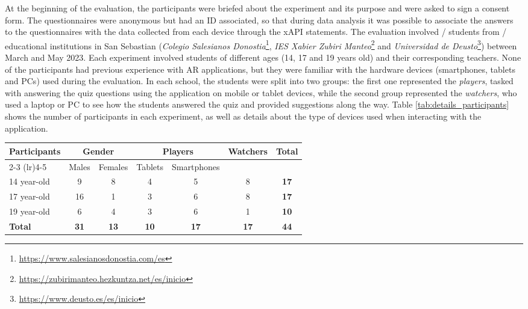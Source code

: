 At the beginning of the evaluation, the participants were briefed about the experiment and its purpose and were asked to sign a consent form.
The questionnaires were anonymous but had an ID associated, so that during data analysis it was possible to associate the answers to the questionnaires with the data collected from each device through the xAPI statements.
The evaluation involved \numstudents/ students from \numschools/ educational institutions in San Sebastian (\textit{Colegio Salesianos Donostia}\footnote{\url{https://www.salesianosdonostia.com/es}}, \textit{IES Xabier Zubiri Manteo}\footnote{\url{https://zubirimanteo.hezkuntza.net/es/inicio}} and \textit{Universidad de Deusto}\footnote{\url{https://www.deusto.es/es/inicio}}) between March and May 2023.
Each experiment involved students of different ages (14, 17 and 19 years old) and their corresponding teachers.
None of the participants had previous experience with AR applications, but they were familiar with the hardware devices (smartphones, tablets and PCs) used during the evaluation.
In each school, the students were split into two groups: the first one represented the \textit{players}, tasked with answering the quiz questions using the application on mobile or tablet devices, while the second group represented the \textit{watchers}, who used a laptop or PC to see how the students answered the quiz and provided suggestions along the way.
Table \ref{tab:details_participants} shows the number of participants in each experiment, as well as details about the type of devices used when interacting with the application.

\begin{table*}[htbp]
\caption{\fontsize{10pt}{11pt}}
  \centering
  \begin{tabular}{l c c c c c c}
    \toprule
    \multirow{2}{*}{Participants} & \multicolumn{2}{c}{Gender} & \multicolumn{2}{c}{Players} & \multirow{2}{*}{Watchers} & \multirow{2}{*}{\textbf{Total}} \\
    \cmidrule(lr){2-3} \cmidrule(lr){4-5}
                            &  \multicolumn{1}{c}{Males} & \multicolumn{1}{c}{Females}  & \multicolumn{1}{c}{Tablets} & \multicolumn{1}{c}{Smartphones} & & \\
    \midrule
    14 year-old & 9 & 8 & 4 & 5 & 8 & \textbf{17} \\
    17 year-old & 16 & 1 & 3 & 6 & 8 & \textbf{17} \\
    19 year-old & 6 & 4 & 3 & 6 & 1 & \textbf{10} \\
    \midrule
    \textbf{Total} & \textbf{31} & \textbf{13} & \textbf{10} & \textbf{17} & \textbf{17} & \textbf{44}\\
    \bottomrule
  \end{tabular}
  \label{tab:details_participants}
\end{table*}

